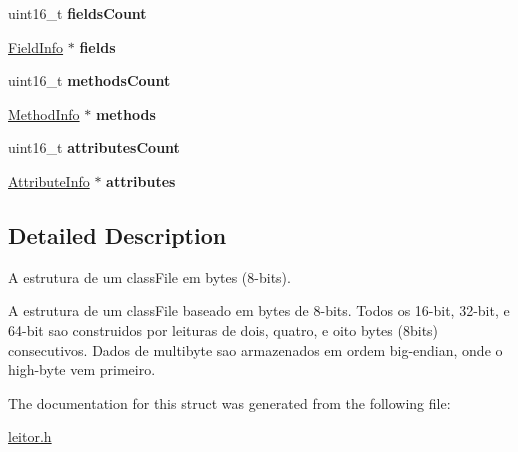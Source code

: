\begin{DoxyCompactItemize}
uint16\+\_\+t {\bfseries fields\+Count}
\item 
\mbox{\label{structClassFile_add171dc12613ad29ef94f4f18a50f06a}} 
\mbox{\hyperlink{structFieldInfo}{Field\+Info}} $\ast$ {\bfseries fields}
\item 
\mbox{\label{structClassFile_a24d224be2ab473bac3506890c6ff6a4d}} 
uint16\+\_\+t {\bfseries methods\+Count}
\item 
\mbox{\label{structClassFile_a67e02d50e6807bb97d7d8f265deef9a0}} 
\mbox{\hyperlink{structMethodInfo}{Method\+Info}} $\ast$ {\bfseries methods}
\item 
\mbox{\label{structClassFile_ad88c9b8262fbd79d49ad2c163ad45716}} 
uint16\+\_\+t {\bfseries attributes\+Count}
\item 
\mbox{\label{structClassFile_ad7db56de00dc682671cb8cfb837d92b7}} 
\mbox{\hyperlink{structAttributeInfo}{Attribute\+Info}} $\ast$ {\bfseries attributes}
\end{DoxyCompactItemize}


\subsection{Detailed Description}
A estrutura de um class\+File em bytes (8-\/bits). 

A estrutura de um class\+File baseado em bytes de 8-\/bits. Todos os 16-\/bit, 32-\/bit, e 64-\/bit sao construidos por leituras de dois, quatro, e oito bytes (8bits) consecutivos. Dados de multibyte sao armazenados em ordem big-\/endian, onde o high-\/byte vem primeiro. 

The documentation for this struct was generated from the following file\+:\begin{DoxyCompactItemize}
\item 
\mbox{\hyperlink{leitor_8h}{leitor.\+h}}\end{DoxyCompactItemize}
